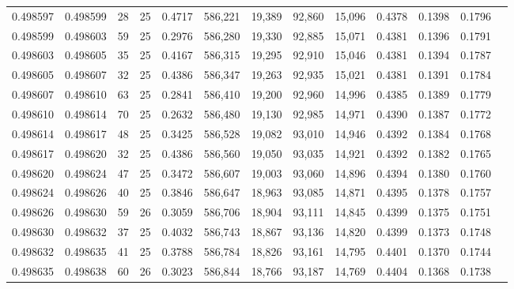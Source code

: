 \begin{tabular}{rrrrrrrrrrrrr}
0.498597 & 0.498599 &    28 &  25 &                                     0.4717 & 586,221 &  19,389 &  92,860 &  15,096 & 0.4378 & 0.1398 & 0.1796 \\
0.498599 & 0.498603 &    59 &  25 &                                     0.2976 & 586,280 &  19,330 &  92,885 &  15,071 & 0.4381 & 0.1396 & 0.1791 \\
0.498603 & 0.498605 &    35 &  25 &                                     0.4167 & 586,315 &  19,295 &  92,910 &  15,046 & 0.4381 & 0.1394 & 0.1787 \\
0.498605 & 0.498607 &    32 &  25 &                                     0.4386 & 586,347 &  19,263 &  92,935 &  15,021 & 0.4381 & 0.1391 & 0.1784 \\
0.498607 & 0.498610 &    63 &  25 &                                     0.2841 & 586,410 &  19,200 &  92,960 &  14,996 & 0.4385 & 0.1389 & 0.1779 \\
0.498610 & 0.498614 &    70 &  25 &                                     0.2632 & 586,480 &  19,130 &  92,985 &  14,971 & 0.4390 & 0.1387 & 0.1772 \\
0.498614 & 0.498617 &    48 &  25 &                                     0.3425 & 586,528 &  19,082 &  93,010 &  14,946 & 0.4392 & 0.1384 & 0.1768 \\
0.498617 & 0.498620 &    32 &  25 &                                     0.4386 & 586,560 &  19,050 &  93,035 &  14,921 & 0.4392 & 0.1382 & 0.1765 \\
0.498620 & 0.498624 &    47 &  25 &                                     0.3472 & 586,607 &  19,003 &  93,060 &  14,896 & 0.4394 & 0.1380 & 0.1760 \\
0.498624 & 0.498626 &    40 &  25 &                                     0.3846 & 586,647 &  18,963 &  93,085 &  14,871 & 0.4395 & 0.1378 & 0.1757 \\
0.498626 & 0.498630 &    59 &  26 &                                     0.3059 & 586,706 &  18,904 &  93,111 &  14,845 & 0.4399 & 0.1375 & 0.1751 \\
0.498630 & 0.498632 &    37 &  25 &                                     0.4032 & 586,743 &  18,867 &  93,136 &  14,820 & 0.4399 & 0.1373 & 0.1748 \\
0.498632 & 0.498635 &    41 &  25 &                                     0.3788 & 586,784 &  18,826 &  93,161 &  14,795 & 0.4401 & 0.1370 & 0.1744 \\
0.498635 & 0.498638 &    60 &  26 &                                     0.3023 & 586,844 &  18,766 &  93,187 &  14,769 & 0.4404 & 0.1368 & 0.1738 \\

\end{tabular}
